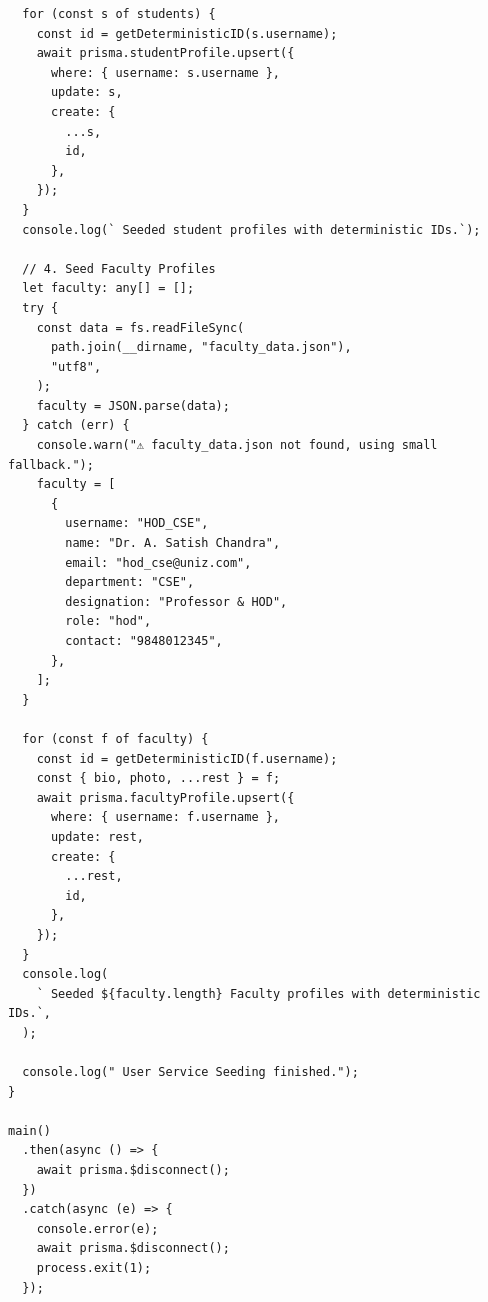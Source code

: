 \documentclass[11pt,a4paper,oneside]{article}
\begin{document}
\begin{lstlisting}
  for (const s of students) {
    const id = getDeterministicID(s.username);
    await prisma.studentProfile.upsert({
      where: { username: s.username },
      update: s,
      create: {
        ...s,
        id,
      },
    });
  }
  console.log(` Seeded student profiles with deterministic IDs.`);

  // 4. Seed Faculty Profiles
  let faculty: any[] = [];
  try {
    const data = fs.readFileSync(
      path.join(__dirname, "faculty_data.json"),
      "utf8",
    );
    faculty = JSON.parse(data);
  } catch (err) {
    console.warn("⚠️ faculty_data.json not found, using small fallback.");
    faculty = [
      {
        username: "HOD_CSE",
        name: "Dr. A. Satish Chandra",
        email: "hod_cse@uniz.com",
        department: "CSE",
        designation: "Professor & HOD",
        role: "hod",
        contact: "9848012345",
      },
    ];
  }

  for (const f of faculty) {
    const id = getDeterministicID(f.username);
    const { bio, photo, ...rest } = f;
    await prisma.facultyProfile.upsert({
      where: { username: f.username },
      update: rest,
      create: {
        ...rest,
        id,
      },
    });
  }
  console.log(
    ` Seeded ${faculty.length} Faculty profiles with deterministic IDs.`,
  );

  console.log(" User Service Seeding finished.");
}

main()
  .then(async () => {
    await prisma.$disconnect();
  })
  .catch(async (e) => {
    console.error(e);
    await prisma.$disconnect();
    process.exit(1);
  });

\end{lstlisting}
\end{document}
